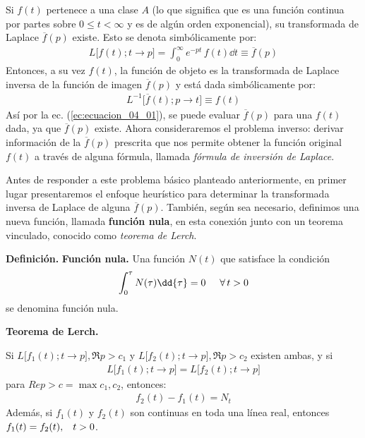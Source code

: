 Si $f (t)$ pertenece a una clase $A$ (lo que significa que es una función continua por partes sobre $0 \leq t < \infty$ y es de algún orden exponencial), su transformada de Laplace $\overline{f} (p)$ existe. Esto se denota simbólicamente por:
\begin{align}
L \big[f(t); t \to p\big] = \int_{0}^{\infty} e^{-p t} \, f(t) \dd{t} \equiv \overline{f} (p)
\label{ec:ecuacion_04_01}
\end{align}
Entonces, a su vez $f (t)$, la función de objeto es la transformada de Laplace inversa de la función de imagen $\overline{f} (p)$ y está dada simbólicamente por:
\begin{align}
L^{-1} \big[\overline{f}(t); p \to t\big] \equiv f (t)
\label{ec:ecuacion_04_02}
\end{align}
Así por la ec. (\ref{ec:ecuacion_04_01}), se puede evaluar $\overline{f} (p)$ para una $f (t)$ dada, ya que $\overline{f} (p)$ existe. Ahora consideraremos el problema inverso: derivar información de la $\overline{f} (p)$ prescrita que nos permite obtener la función original $f (t)$ a través de alguna fórmula, llamada \emph{fórmula de inversión de Laplace}.
\par
Antes de responder a este problema básico planteado anteriormente, en primer lugar presentaremos el enfoque heurístico para determinar la transformada inversa de Laplace de alguna $\overline{f}(p)$. También, según sea necesario, definimos una nueva función, llamada \textbf{función nula}, en esta conexión junto con un teorema vinculado, conocido como \emph{teorema de Lerch}.
\par
\noindent \textbf{Definición.} \textbf{Función nula.} Una función $N (t)$ que satisface la condición
\begin{align*}
\int_{0}^{\tau} N(\tau) \dd{\tau} = 0 \hspace{0.5cm} \forall \, t > 0
\end{align*}
se denomina función nula.
\par
\noindent \textbf{Teorema de Lerch.}

\noindent Si $L \big[f_{1} (t); t \to p\big], \Re {p} > c_{1}$ y $L \big[f_{2} (t); t \to p\big], \Re {p} > c_{2}$ existen ambas, y si
\begin{align*}
L \big[f_{1} (t); t \to p\big] = L \big[f_{2} (t); t \to p\big]
\end{align*}
para $Re{p} > c = \max{c_{1},c_{2}}$, entonces:
\begin{align*}
f_{2} (t) - f_{1} (t) = N_{t}
\end{align*}
Además, si $f_{1}(t)$ y $f_{2}(t)$ son continuas en toda una línea real, entonces $f_{1}(t) = f_{2}(t), \hspace{0.3cm} t > 0$.
